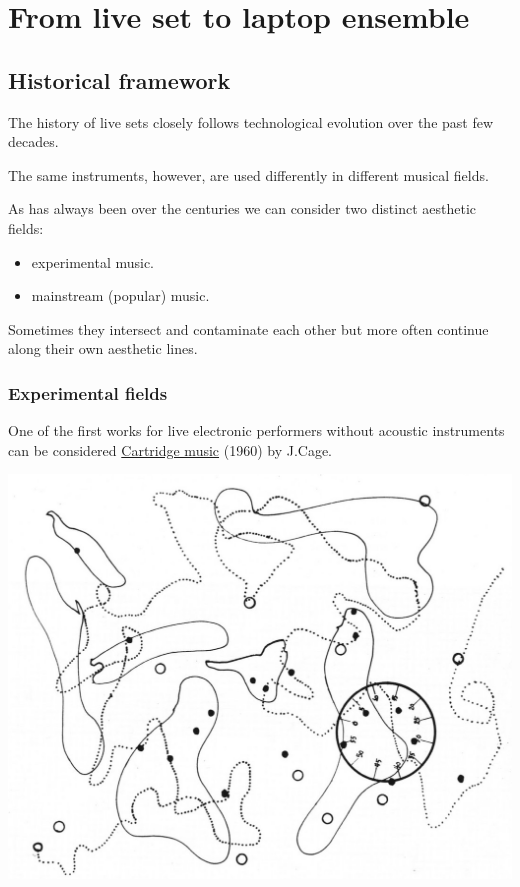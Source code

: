 \chapter{From live set to laptop ensemble}

\section{Historical framework}\label{historical-framework}
The history of live sets closely follows technological evolution over the past few decades.

The same instruments, however, are used differently in different musical fields. 

As has always been over the centuries we can consider two distinct aesthetic fields:

\begin{itemize}
\tightlist
\item experimental music.
\item mainstream (popular) music.
\end{itemize}

Sometimes they intersect and contaminate each other but more often continue along their own aesthetic lines.

\subsection{Experimental fields}\label{experimantal-fields}

One of the first works for live electronic performers without acoustic instruments can be considered \href{http://www.musicaecodice.it/gitmedia/emc/6_lvset/suoni/cartridge.mp3}{Cartridge music} (1960) by J.Cage.

\begin{center}
\includegraphics[scale=0.3]{../img/cartridge.png}
\end{center}

